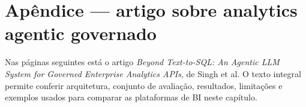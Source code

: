 

\clearpage
\chapter*{Apêndice --- artigo sobre analytics agentic governado}

Nas páginas seguintes está o artigo \textit{Beyond Text-to-SQL: An Agentic LLM System for Governed Enterprise Analytics APIs}, de Singh et al. O texto integral permite conferir arquitetura, conjunto de avaliação, resultados, limitações e exemplos usados para comparar as plataformas de BI neste capítulo.


